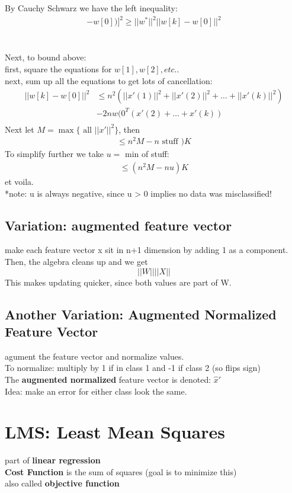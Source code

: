 \documentclass[12pt]{article}
\newcommand{\bt}[1]{\textbf{#1}} %
\newcommand{\eq}[1]{\begin{align*}#1\end{align*}} %
\renewcommand{\eq}[1]{\begin{align*}#1\end{align*}} %
\begin{document}
By Cauchy Schwarz we have the left inequality: 
\eq{[w^* ( w[k] - w[0])]^2 \geq ||w^*||^2 ||w[k] - w[0]||^2}\\
\ \\
Next, to bound above: \\
first, square the equations for $w[1], w[2], etc.$.\\
next, sum up all the equations to get lots of cancellation:
\eq{||w[k] - w[0]||^2  &\leq n^2 (||x'(1)||^2 + ||x'(2)||^2 + \dots + ||x'(k)||^2)\\
&-2nw(0^T(x'(2) + \dots + x'(k))\\
}
Next let $M = \max\{ \text{ all } ||x'||^2\}$, then 
\eq{ \leq n^2 M -n \text{ stuff })K}
To simplify further we take $u =$ min of stuff: 
\eq{ \leq (n^2 M - n u ) K }
et voila.\\
*note: u is always negative, since u > 0 implies no data was misclassified!


\subsection*{Variation: augmented feature vector}
make each feature vector x sit in n+1 dimension by adding 1 as a component. Then, the algebra cleans up and we get 
$$||W|| ||X||$$
This makes updating quicker, since both values are part of W.

\subsection*{Another Variation: Augmented Normalized Feature Vector}
agument the feature vector and normalize values.\\

To normalize: multiply by 1 if in class 1 and -1 if class 2 (so flips sign)\\

The \bt{augmented normalized} feature vector is denoted: $\hat{x}'$ \\
Idea: make an error for either class look the same.



\section*{LMS: Least Mean Squares}
part of \bt{linear regression}\\
\bt{Cost Function} is the sum of squares (goal is to minimize this)\\
also called \bt{objective function}
\end{document}
